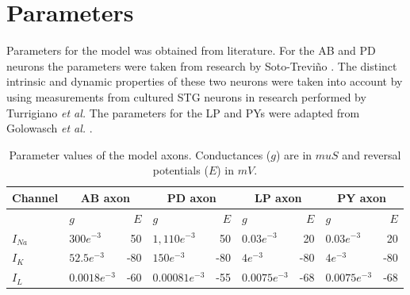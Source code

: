 \section{Parameters}
Parameters for the model was obtained from literature. For the \ac{AB} and \ac{PD} neurons the parameters were taken from research by Soto-Trevi\~{n}o \cite{Soto-Trevino2005}. The distinct intrinsic and dynamic properties of these two neurons were taken into account by using measurements from cultured \ac{STG} neurons in research performed by Turrigiano \textit{et al.} \cite{Turrigiano1995} The parameters for the \ac{LP} and \acp{PY} were adapted from Golowasch \textit{et al.} \cite{Golowasch1999a}.

\renewcommand{\tablename}{Table}
\begin{table}[H]
	\centering
	\tiny
	\caption{Parameter values of the model axons. Conductances ($g$) are in $mu S$ and reversal potentials ($E$) in $mV$.}
	\label{tab:modelparameters1}
	\begin{tabular}{ l l r l r l r l r}
		\hline
		\bf Channel & \multicolumn{2}{c}{\bf AB axon} & \multicolumn{2}{c}{\bf PD axon} & \multicolumn{2}{c}{\bf LP axon}& \multicolumn{2}{c}{\bf PY axon}\\ 
		\hline
		 & $g$ & $E$ & $g$ & $E$ & $g$ & $E$& $g$ & $E$\\ 
		\hline
		$I_{Na}$& $300e^{-3}$ & 50 \vline& $1,110e^{-3}$ & 50 \vline& $0.03e^{-3}$ & 20 \vline& $0.03e^{-3}$ & 20 \\ 
		$I_{K}$& $52.5e^{-3}$ & -80 \vline& $150e^{-3}$ & -80 \vline& $4e^{-3}$ & -80 \vline& $4e^{-3}$ & -80 \\
		$I_{L}$& $0.0018e^{-3}$ & -60 \vline& $0.00081e^{-3}$ & -55 \vline& $0.0075e^{-3}$ & -68\vline& $0.0075e^{-3}$ & -68\\
		\hline
	\end{tabular}
\end{table}

